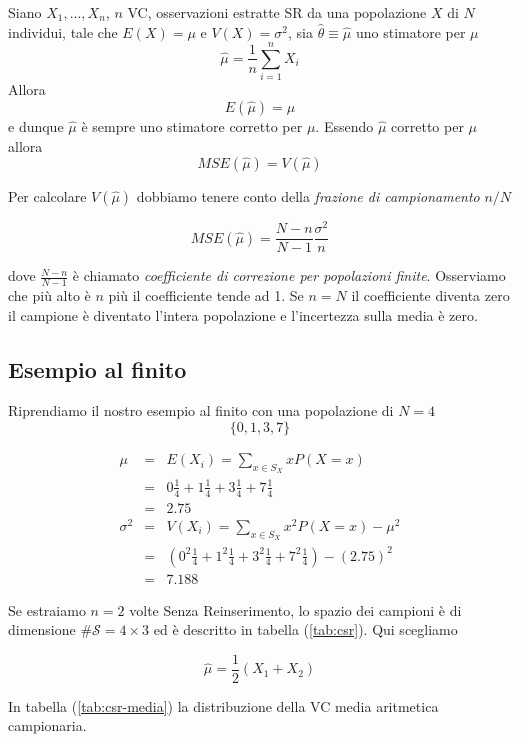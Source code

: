 \documentclass[
  11pt,
]{book}
\theoremstyle{mytheoremstyle}
\theoremstyle{mydefstyle}
\begin{document}
Siano \(X_1,...,X_n\), \(n\) VC, osservazioni estratte SR da una popolazione \(X\) di \(N\) individui, tale che \(E(X)=\mu\) e \(V(X)=\sigma^2\), sia \(\hat\theta\equiv\hat \mu\) uno stimatore per \(\mu\)
\[
\hat \mu=\frac 1 n \sum_{i=1}^n X_i
\]
Allora
\[
E(\hat \mu)=\mu
\]
e dunque \(\hat \mu\) è sempre uno stimatore corretto per \(\mu\).
Essendo \(\hat \mu\) corretto per \(\mu\) allora
\[MSE(\hat \mu)=V(\hat \mu)\]

Per calcolare \(V(\hat \mu)\) dobbiamo tenere conto della \emph{frazione di campionamento} \(n/N\)

\begin{info}
\[
MSE(\hat \mu)=\frac{N-n}{N-1}\frac{\sigma^2} n
\]

\end{info}

dove \(\frac{N-n}{N-1}\) è chiamato \emph{coefficiente di correzione per popolazioni finite}.
Osserviamo che più alto è \(n\) più il coefficiente tende ad 1.
Se \(n = N\) il coefficiente diventa zero il campione è diventato l'intera popolazione e
l'incertezza sulla media è zero.

\subsection{Esempio al finito}\label{esempio-al-finito-1}

Riprendiamo il nostro esempio al finito con una popolazione di \(N=4\)
\[\{0,1,3,7\}\]

\begin{eqnarray*} \mu &=& E(X_i) = \sum_{x\in S_X}x P(X=x)\\ 
 &=&  0  \frac { 1 }{ 4 }+ 1  \frac { 1 }{ 4 }+ 3  \frac { 1 }{ 4 }+ 7  \frac { 1 }{ 4 } \\ 
            &=& 2.75 \\ 
 \sigma^2 &=& V(X_i) = \sum_{x\in S_X}x^2 P(X=x)-\mu^2\\ 
 &=&\left(  0  ^2\frac { 1 }{ 4 }+ 1  ^2\frac { 1 }{ 4 }+ 3  ^2\frac { 1 }{ 4 }+ 7  ^2\frac { 1 }{ 4 } \right)-( 2.75 )^2\\ 
            &=& 7.188 
\end{eqnarray*}

Se estraiamo \(n=2\) volte Senza Reinserimento, lo spazio dei campioni è di dimensione \(\#\mathcal{S}=4\times 3\) ed è descritto in tabella (\ref{tab:csr}). Qui scegliamo

\[
\hat\mu = \frac{1}{2}(X_1+X_2)
\]

In tabella (\ref{tab:csr-media}) la distribuzione della VC media aritmetica campionaria.
\end{document}
